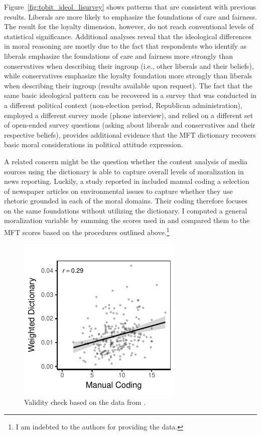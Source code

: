\documentclass[12pt]{article}
\begin{document}
Figure~\ref{fig:tobit_ideol_lisurvey} shows patterns that are consistent with previous results. Liberals are more likely to emphasize the foundations of care and fairness. The result for the loyalty dimension, however, do not reach conventional levels of statistical significance. Additional analyses reveal that the ideological differences in moral reasoning are mostly due to the fact that respondents who identify as liberals emphasize the foundations of care and fairness more strongly than conservatives when describing their ingroup (i.e., other liberals and their beliefs), while conservatives emphasize the loyalty foundation more strongly than liberals when describing their ingroup (results available upon request). The fact that the same basic ideological pattern can be recovered in a survey that was conducted in a different political context (non-election period, Republican administration), employed a different survey mode (phone interview), and relied on a different set of open-ended survey questions (asking about liberals and conservatives and their respective beliefs), provides additional evidence that the MFT dictionary recovers basic moral considerations in political attitude expression.



A related concern might be the question whether the content analysis of media sources using the dictionary is able to capture overall levels of moralization in news reporting. Luckily, a study reported in \citet{feinberg2013moral} included manual coding a selection of newspaper articles on environmental issues to capture whether they use rhetoric grounded in each of the moral domains. Their coding therefore focuses on the same foundations without utilizing the dictionary. I computed a general moralization variable by summing the scores used in \citet{feinberg2013moral} and compared them to the MFT scores based on the procedures outlined above.\footnote{I am indebted to the authors for providing the data.}

\begin{figure}[ht]\centering
\includegraphics{../calc/fig/feinberg_general.pdf}
\caption{Validity check based on the data from \citet{feinberg2013moral}.}\label{fig:ols_feinberg}
\end{figure}
\end{document}
